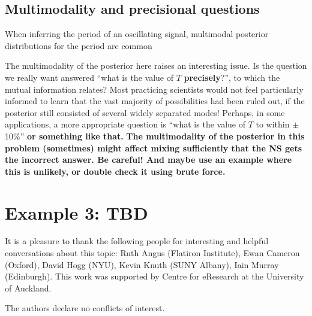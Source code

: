 \documentclass[entropy,article,accept,oneauthor,pdftex,10pt,a4paper]{mdpi}
\newcommand{\todo}{\color{orange} \bf}
\newcommand{\query}{\color{green} \bf}
\begin{document}
\subsection{Multimodality and precisional questions}

When inferring the period of an oscillating signal, multimodal posterior
distributions for the period are common \citep{gregoryTrimodal, exoplanet}

The multimodality of the posterior here raises an interesting issue. Is
the question we really want answered ``what is the value of $T$
{\bf precisely}?'', to which the mutual information relates?
Most practicing scientists would not feel particularly informed to learn
that the vast majority of possibilities had been ruled out, if the
posterior still consisted of several widely separated modes!
Perhaps, in some applications, a more appropriate question is
``what is the value of $T$ to within $\pm$ 10\%''
{\todo or something like that.}
{\query The multimodality of the posterior in this problem (sometimes) might
affect mixing sufficiently that the NS gets the incorrect answer. Be
careful! And maybe use an example where this is unlikely, or double
check it using brute force.}


\section{Example 3: TBD}

It is a pleasure to thank the following people for interesting and helpful
conversations about this topic: Ruth Angus (Flatiron Institute),
Ewan Cameron (Oxford), David Hogg (NYU), Kevin Knuth (SUNY Albany),
Iain Murray (Edinburgh). This work was supported by Centre for eResearch
at the University of Auckland.




The authors declare no conflicts of interest.

%
\makeatletter
\renewcommand\@biblabel[1]{#1. }
\makeatother
\end{document}
